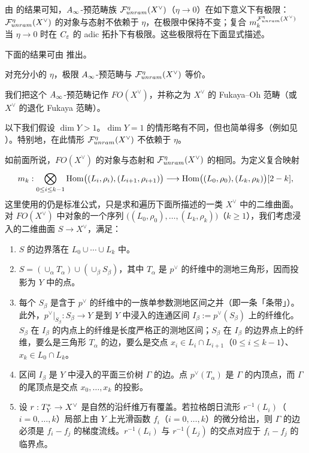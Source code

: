 由 \cite{FuO} 的结果可知，$A_{\infty}$-预范畴族 $\mathcal{F}^\eta_{unram}(X^\vee)$（$\eta\to0$）在如下意义下有极限：$\mathcal{F}^\eta_{unram}(X^\vee)$ 的对象与态射不依赖于 $\eta$，在极限中保持不变；复合 $m_k^{\mathcal{F}^\eta_{unram}(X^\vee)}$ 当 $\eta\to0$ 时在 $C_{\varepsilon}$ 的 adic 拓扑下有极限。这些极限将在下面显式描述。

下面的结果可由 \cite{FuO} 推出。

\begin{prp}
对充分小的 $\eta$，极限 $A_{\infty}$-预范畴与 $\mathcal{F}^\eta_{unram}(X^\vee)$ 等价。
\end{prp}

我们把这个 $A_{\infty}$-预范畴记作 $FO(X^\vee)$，并称之为 $X^\vee$ 的 Fukaya--Oh 范畴（或 $X^\vee$ 的退化 Fukaya 范畴）。

\begin{rmk}
以下我们假设 $\dim Y>1$。$\dim Y=1$ 的情形略有不同，但也简单得多（例如见 \cite{P1}）。特别地，在此情形 $\mathcal{F}^\eta_{unram}(X^\vee)$ 不依赖于 $\eta$。
\end{rmk}

如前面所说，$FO(X^\vee)$ 的对象与态射和 $\mathcal{F}^\eta_{unram}(X^\vee)$ 的相同。为定义复合映射
\[
  m_k:\bigotimes_{0\le i\le k-1}\operatorname{Hom}\bigl((L_i,\rho_i),(L_{i+1},\rho_{i+1})\bigr)
  \longrightarrow\operatorname{Hom}\bigl((L_0,\rho_0),(L_k,\rho_k)\bigr)[2-k],
\]
这里使用的仍是标准公式，只是求和遍历下面所描述的一类 $X^\vee$ 中的二维曲面。对 $FO(X^\vee)$ 中对象的一个序列 $\bigl((L_0,\rho_0),\dots,(L_k,\rho_k)\bigr)$（$k\ge1$），我们考虑浸入的二维曲面 $S\to X^\vee$，满足：
\begin{enumerate}[label=\alph*),leftmargin=2.2em,itemsep=2pt,topsep=3pt]
\item $S$ 的边界落在 $L_0\cup\cdots\cup L_k$ 中。
\item $S=(\cup_\alpha T_\alpha)\cup(\cup_\beta S_\beta)$，其中 $T_\alpha$ 是 $p^\vee$ 的纤维中的测地三角形，因而投影为 $Y$ 中的点。
\item 每个 $S_\beta$ 是含于 $p^\vee$ 的纤维中的一族单参数测地区间之并（即一条「条带」）。此外，$p^\vee|_{S_\beta}:S_\beta\to Y$ 是到 $Y$ 中浸入的连通区间 $I_\beta:=p^\vee(S_\beta)$ 上的纤维化。$S_\beta$ 在 $I_\beta$ 的内点上的纤维是长度严格正的测地区间；$S_\beta$ 在 $I_\beta$ 的边界点上的纤维，要么是三角形 $T_\alpha$ 的边，要么是交点 $x_i\in L_i\cap L_{i+1}$（$0\le i\le k-1$）、$x_k\in L_0\cap L_k$。
\item 区间 $I_\beta$ 是 $Y$ 中浸入的平面三价树 $\Gamma$ 的边。点 $p^\vee(T_\alpha)$ 是 $\Gamma$ 的内顶点，而 $\Gamma$ 的尾顶点是交点 $x_0,\dots,x_k$ 的投影。
\item 设 $r:T^{*}_Y\to X^\vee$ 是自然的沿纤维万有覆盖。若拉格朗日流形 $r^{-1}(L_i)$（$i=0,\dots,k$）局部上由 $Y$ 上光滑函数 $f_i$（$i=0,\dots,k$）的微分给出，则 $\Gamma$ 的边必须是 $f_i-f_j$ 的梯度流线。$r^{-1}(L_i)$ 与 $r^{-1}(L_j)$ 的交点对应于 $f_i-f_j$ 的临界点。
\end{enumerate}

